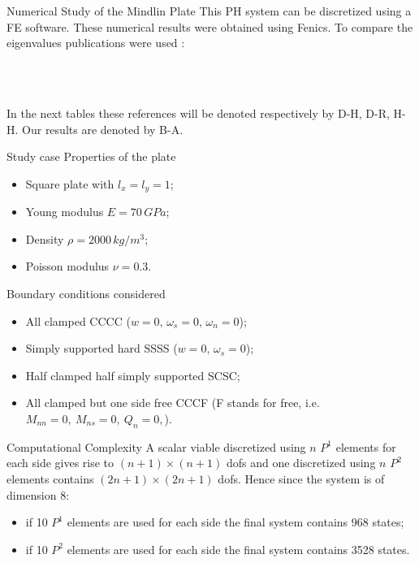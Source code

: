 \documentclass{beamer}
\begin{document}
\begin{frame}{Numerical Study of the Mindlin Plate}
This PH system can be discretized using a FE software. These numerical results were obtained using Fenics.
To compare the eigenvalues publications 
\cite{duran1999approximation,dawe1980rayleigh,huang1984nine} were used : 

\footnotesize
{} \\
\\

\normalsize
In the next tables these references will be denoted respectively by D-H, D-R, H-H. Our results are denoted by B-A.
\end{frame}

\begin{frame}{Study case}
	Properties of the plate
	\begin{itemize}
		\item Square plate with $l_x=l_y=1$;
		\item Young modulus $E = 70 \, GPa$;
		\item Density $\rho = 2000 \, kg/m^3$;
		\item Poisson modulus $\nu = 0.3$. 
	\end{itemize}
	Boundary conditions considered
	\begin{itemize}
		\item All clamped CCCC ($w = 0, \, \omega_s = 0, \, \omega_n = 0$); 
		\item Simply supported hard SSSS ($w = 0, \, \omega_s = 0$);
		\item Half clamped half simply supported SCSC;
		\item All clamped but one side free CCCF (F stands for free, i.e. $M_{nn} = 0, \ M_{ns} = 0, \ Q_{n} = 0,  $). 
	\end{itemize}


\end{frame}

\begin{frame}{Computational Complexity}
	A scalar viable discretized using $n$  $P^1$ elements for each side gives rise to $(n+1)\times(n+1)$ dofs and one discretized using $n$ $P^2$ elements contains $(2n+1)\times(2n+1)$ dofs. Hence since the system is of dimension 8:
	\begin{itemize}
		\item if 10 $P^1$ elements are used for each side the final system contains 968 states;
		\item if 10 $P^2$ elements are used for each side the final system contains 3528 states.
	\end{itemize}

\end{frame}
\end{document}
